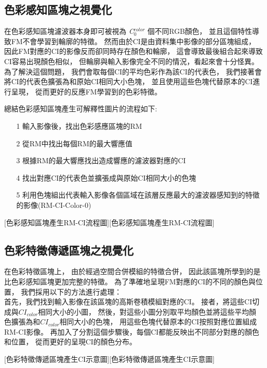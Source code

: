 \documentclass[class=NCU_thesis, crop=false]{standalone}
\begin{document}
	\pagebreak
	\subsection{色彩感知區塊之視覺化}
	在色彩感知區塊濾波器本身即可被視為 \textit{C}$^{color}_{0}$ 個不同RGB顏色，
	並且這個特性導致FM不會學習到輪廓的特徵。
	然而由於CI是由資料集中影像的部分區塊組成，
	因此FM對應的CI的影像反而卻同時存在顏色和輪廓，
	這會導致最後組合起來導致CI容易出現顏色相似，
	但輪廓與輸入影像完全不同的情況，看起來會十分怪異。
	為了解決這個問題，
	我們會取每個CI的平均色彩作為該CI的代表色，
	我們接著會將CI的代表色擴張為和原始CI相同大小色塊，
	並且使用這些色塊代替原本的CI進行呈現，
	從而更好的反應FM學習到的色彩特徵。

	總結色彩感知區塊產生可解釋性圖片的流程如下:
	\begin{itemize}
		\item [1]
		輸入影像後，找出色彩感應區塊的RM
		\item [2]
		從RM中找出每個RM的最大響應值
		\item [3]
		根據RM的最大響應找出造成響應的濾波器對應的CI
		\item [4]
		找出對應CI的代表色並擴張成與原始CI相同大小的色塊
		\item [5]
		利用色塊組出代表輸入影像各個區域在該層反應最大的濾波器感知到的特徵的影像(RM-CI-Color-0)
	\end{itemize}

	[色彩感知區塊產生RM-CI流程圖][色彩感知區塊產生RM-CI流程圖]

	\pagebreak

	\subsection{色彩特徵傳遞區塊之視覺化}
	在色彩特徵區塊上，
	由於經過空間合併模組的特徵合併，
	因此該區塊所學到的是比色彩感知區塊更加完整的特徵。
	為了準確地呈現FM對應的CI的不同的顏色與位置，
	我們採用以下的方法進行處理：\\
	首先，我們找到輸入影像在該區塊的高斯卷積模組對應的CI。
	接者，將這些CI切成與$CI_{color}$相同大小的小圖，
	然後，對這些小圖分別取平均顏色並將這些平均顏色擴張為和$CI_{color}$相同大小的色塊，
	用這些色塊代替原本的CI按照對應位置組成RM-CI影像。
	再加入了分割這個步驟後，每個CI都能反映出不同部分對應的顏色和位置，
	從而更好的呈現CI的顏色分布。

	[色彩特徵傳遞區塊產生CI示意圖][色彩特徵傳遞區塊產生CI示意圖]
\end{document}
